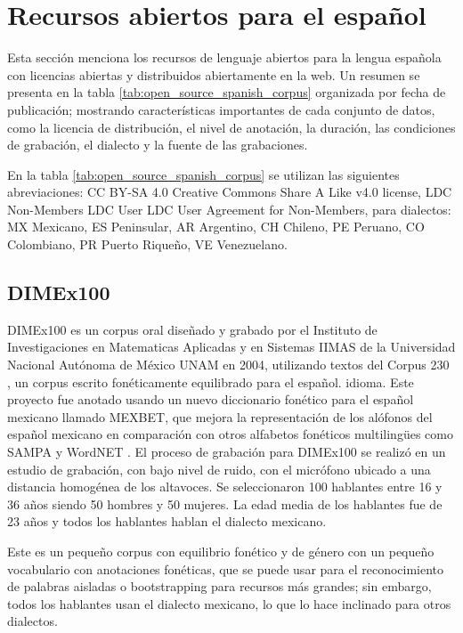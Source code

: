 \documentclass[a4paper,12pt,twoside]{report}
\begin{document}
\section{Recursos abiertos para el español}

Esta sección menciona los recursos de lenguaje abiertos para la lengua española con licencias abiertas y distribuidos abiertamente en la web. Un resumen se presenta en la tabla \ref{tab:open_source_spanish_corpus} organizada por fecha de publicación; mostrando características importantes de cada conjunto de datos, como la licencia de distribución, el nivel de anotación, la duración, las condiciones de grabación, el dialecto y la fuente de las grabaciones.

En la tabla \ref{tab:open_source_spanish_corpus} se utilizan las siguientes abreviaciones:  CC BY-SA 4.0 Creative Commons Share A Like v4.0 license, LDC Non-Members LDC User LDC User Agreement for Non-Members, para dialectos: MX Mexicano, ES Peninsular, AR Argentino, CH Chileno, PE Peruano, CO Colombiano, PR Puerto Riqueño, VE Venezuelano.



\subsection{DIMEx100}

DIMEx100 es un corpus oral diseñado y grabado por el Instituto de Investigaciones en Matematicas Aplicadas y en Sistemas IIMAS de la Universidad Nacional Autónoma de México UNAM en 2004, utilizando textos del Corpus 230 \cite{Corpus230}, un corpus escrito fonéticamente equilibrado para el español. idioma. Este proyecto fue anotado usando un nuevo diccionario fonético para el español mexicano llamado MEXBET, que mejora la representación de los alófonos del español mexicano en comparación con otros alfabetos fonéticos multilingües como SAMPA y WordNET \cite{mexbet}. El proceso de grabación para DIMEx100 se realizó en un estudio de grabación, con bajo nivel de ruido, con el micrófono ubicado a una distancia homogénea de los altavoces. Se seleccionaron 100 hablantes entre 16 y 36 años siendo 50 hombres y 50 mujeres. La edad media de los hablantes fue de 23 años y todos los hablantes hablan el dialecto mexicano.

Este es un pequeño corpus con equilibrio fonético y de género con un pequeño vocabulario con anotaciones fonéticas, que se puede usar para el reconocimiento de palabras aisladas o bootstrapping para recursos más grandes; sin embargo, todos los hablantes usan el dialecto mexicano, lo que lo hace inclinado para otros dialectos.
\end{document}
